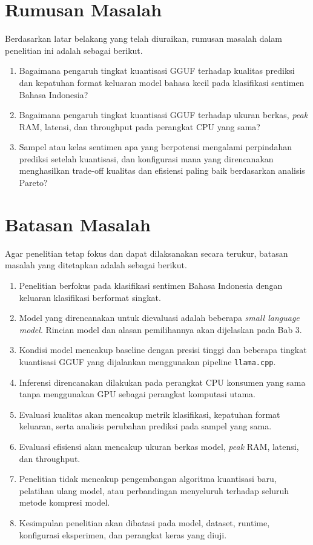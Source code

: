 \section{Rumusan Masalah}

Berdasarkan latar belakang yang telah diuraikan, rumusan masalah dalam penelitian ini adalah sebagai berikut.

\begin{enumerate}
  \item Bagaimana pengaruh tingkat kuantisasi GGUF terhadap kualitas prediksi dan kepatuhan format keluaran model bahasa kecil pada klasifikasi sentimen Bahasa Indonesia?
  \item Bagaimana pengaruh tingkat kuantisasi GGUF terhadap ukuran berkas, \textit{peak} RAM, latensi, dan throughput pada perangkat CPU yang sama?
  \item Sampel atau kelas sentimen apa yang berpotensi mengalami perpindahan prediksi setelah kuantisasi, dan konfigurasi mana yang direncanakan menghasilkan trade-off kualitas dan efisiensi paling baik berdasarkan analisis Pareto?
\end{enumerate}

\section{Batasan Masalah}

Agar penelitian tetap fokus dan dapat dilaksanakan secara terukur, batasan masalah yang ditetapkan adalah sebagai berikut.

\begin{enumerate}
  \item Penelitian berfokus pada klasifikasi sentimen Bahasa Indonesia dengan keluaran klasifikasi berformat singkat.
  \item Model yang direncanakan untuk dievaluasi adalah beberapa \textit{small language model}. Rincian model dan alasan pemilihannya akan dijelaskan pada Bab 3.
  \item Kondisi model mencakup baseline dengan presisi tinggi dan beberapa tingkat kuantisasi GGUF yang dijalankan menggunakan pipeline \texttt{llama.cpp}.
  \item Inferensi direncanakan dilakukan pada perangkat CPU konsumen yang sama tanpa menggunakan GPU sebagai perangkat komputasi utama.
  \item Evaluasi kualitas akan mencakup metrik klasifikasi, kepatuhan format keluaran, serta analisis perubahan prediksi pada sampel yang sama.
  \item Evaluasi efisiensi akan mencakup ukuran berkas model, \textit{peak} RAM, latensi, dan throughput.
  \item Penelitian tidak mencakup pengembangan algoritma kuantisasi baru, pelatihan ulang model, atau perbandingan menyeluruh terhadap seluruh metode kompresi model.
  \item Kesimpulan penelitian akan dibatasi pada model, dataset, runtime, konfigurasi eksperimen, dan perangkat keras yang diuji.
\end{enumerate}

